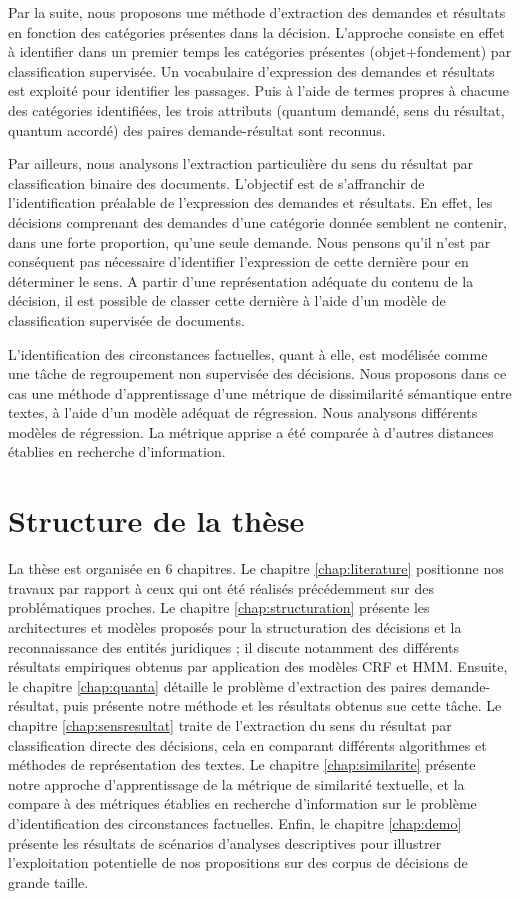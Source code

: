 Par la suite, nous proposons une méthode d'extraction des demandes et résultats en fonction des catégories présentes dans la décision. L'approche consiste en effet à identifier dans un premier temps les catégories présentes (objet+fondement) par classification supervisée. Un vocabulaire d'expression des demandes et résultats est exploité pour identifier les passages. Puis à l'aide de termes propres à chacune des catégories identifiées, les trois attributs (quantum demandé, sens du résultat, quantum accordé) des paires demande-résultat sont reconnus. 

Par ailleurs, nous analysons l'extraction particulière du sens du résultat par classification binaire des documents. L'objectif est de s'affranchir de l'identification préalable de l'expression des demandes et résultats. En effet, les décisions comprenant des demandes d'une catégorie donnée semblent ne contenir, dans une forte proportion, qu'une seule demande. Nous pensons qu'il n'est par conséquent pas nécessaire d'identifier l'expression de cette dernière pour en déterminer le sens. A partir d'une représentation adéquate du contenu de la décision, il est possible de classer cette dernière à l'aide d'un modèle de classification supervisée de documents.

L'identification des circonstances factuelles, quant à elle, est modélisée comme une tâche de regroupement non supervisée des décisions. Nous proposons dans ce cas une méthode d'apprentissage d'une métrique de dissimilarité sémantique entre textes, à l'aide d'un modèle adéquat de régression. Nous analysons différents modèles de régression. La métrique apprise a été comparée à d'autres distances établies en recherche d'information.

\section{Structure de la thèse}
\label{sec:intro:organisation}

La thèse est organisée en 6 chapitres. Le chapitre \ref{chap:literature} positionne nos travaux par rapport à ceux qui ont été réalisés précédemment sur des problématiques proches. Le chapitre \ref{chap:structuration} présente les architectures et modèles proposés pour la structuration des décisions et la reconnaissance des entités juridiques ; il discute notamment des différents résultats empiriques obtenus par application des modèles CRF et HMM. Ensuite, le chapitre \ref{chap:quanta} détaille le problème  d'extraction des paires demande-résultat, puis présente notre méthode et les résultats obtenus sue cette tâche. Le chapitre \ref{chap:sensresultat} traite de l'extraction du sens du résultat par classification directe des décisions, cela en comparant différents algorithmes et méthodes de représentation des textes. Le chapitre \ref{chap:similarite} présente notre approche d'apprentissage de la métrique de similarité textuelle, et la compare à des métriques établies en recherche d'information sur le problème d'identification des circonstances factuelles. Enfin, le chapitre \ref{chap:demo} présente les résultats de scénarios d'analyses descriptives pour illustrer l'exploitation potentielle de nos propositions sur des corpus de décisions de grande taille. 
